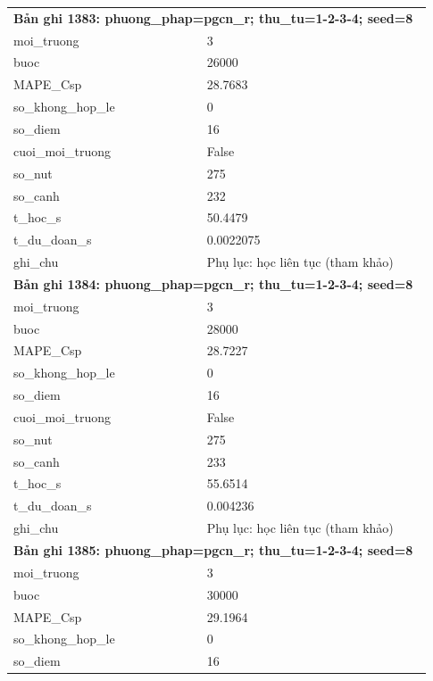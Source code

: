 \begin{longtable}{p{0.43\linewidth}p{0.50\linewidth}}
\midrule
\multicolumn{2}{p{0.95\linewidth}}{\textbf{Bản ghi 1383: phuong\_phap=pgcn\_r; thu\_tu=1-2-3-4; seed=8}} \\
moi\_\allowbreak truong & 3 \\
buoc & 26000 \\
MAPE\_\allowbreak Csp & 28.7683 \\
so\_\allowbreak khong\_\allowbreak hop\_\allowbreak le & 0 \\
so\_\allowbreak diem & 16 \\
cuoi\_\allowbreak moi\_\allowbreak truong & False \\
so\_\allowbreak nut & 275 \\
so\_\allowbreak canh & 232 \\
t\_\allowbreak hoc\_\allowbreak s & 50.4479 \\
t\_\allowbreak du\_\allowbreak doan\_\allowbreak s & 0.0022075 \\
ghi\_\allowbreak chu & Phụ lục: học liên tục (tham khảo) \\
\midrule
\multicolumn{2}{p{0.95\linewidth}}{\textbf{Bản ghi 1384: phuong\_phap=pgcn\_r; thu\_tu=1-2-3-4; seed=8}} \\
moi\_\allowbreak truong & 3 \\
buoc & 28000 \\
MAPE\_\allowbreak Csp & 28.7227 \\
so\_\allowbreak khong\_\allowbreak hop\_\allowbreak le & 0 \\
so\_\allowbreak diem & 16 \\
cuoi\_\allowbreak moi\_\allowbreak truong & False \\
so\_\allowbreak nut & 275 \\
so\_\allowbreak canh & 233 \\
t\_\allowbreak hoc\_\allowbreak s & 55.6514 \\
t\_\allowbreak du\_\allowbreak doan\_\allowbreak s & 0.004236 \\
ghi\_\allowbreak chu & Phụ lục: học liên tục (tham khảo) \\
\midrule
\multicolumn{2}{p{0.95\linewidth}}{\textbf{Bản ghi 1385: phuong\_phap=pgcn\_r; thu\_tu=1-2-3-4; seed=8}} \\
moi\_\allowbreak truong & 3 \\
buoc & 30000 \\
MAPE\_\allowbreak Csp & 29.1964 \\
so\_\allowbreak khong\_\allowbreak hop\_\allowbreak le & 0 \\
so\_\allowbreak diem & 16 \\

\end{longtable}
